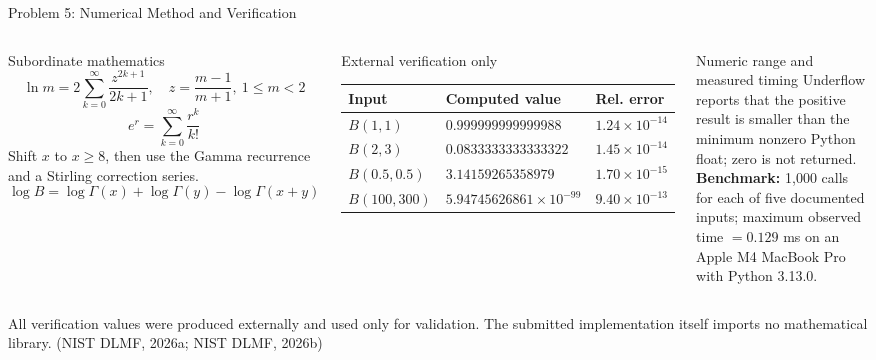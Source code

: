 \documentclass[aspectratio=169,10pt]{beamer}
\newcommand{\smallcite}[1]{{\scriptsize (#1)}}
\begin{document}
\begin{frame}{Problem 5: Numerical Method and Verification}
  \begin{columns}[T]
    \begin{block}{Subordinate mathematics}
      \footnotesize
      \[
        \ln m=2\sum_{k=0}^{\infty}
        \frac{z^{2k+1}}{2k+1},
        \quad z=\frac{m-1}{m+1},\ 1\le m<2
      \]
      \[
        e^r=\sum_{k=0}^{\infty}\frac{r^k}{k!}
      \]
      Shift \(x\) to \(x\ge 8\), then use the Gamma recurrence and a Stirling
      correction series.
      \[
        \log B=\log\Gamma(x)+\log\Gamma(y)-\log\Gamma(x+y)
      \]
    \end{block}

    \begin{block}{External verification only}
      \scriptsize
      \begin{tabular}{@{}lll@{}}
        \toprule
        Input & Computed value & Rel. error\\
        \midrule
        \(B(1,1)\) & \(0.999999999999988\) & \(1.24\times10^{-14}\)\\
        \(B(2,3)\) & \(0.0833333333333322\) & \(1.45\times10^{-14}\)\\
        \(B(0.5,0.5)\) & \(3.14159265358979\) & \(1.70\times10^{-15}\)\\
        \(B(100,300)\) & \(5.94745626861\times10^{-99}\) & \(9.40\times10^{-13}\)\\
        \bottomrule
      \end{tabular}
    \end{block}

    \begin{alertblock}{Numeric range and measured timing}
      \scriptsize
      Underflow reports that the positive result is smaller than the minimum
      nonzero Python float; zero is not returned.\\[0.25em]
      \textbf{Benchmark:} 1,000 calls for each of five documented inputs;
      maximum observed time \(=0.129\) ms on an Apple M4 MacBook Pro with
      Python 3.13.0.
    \end{alertblock}
  \end{columns}

  \scriptsize
  All verification values were produced externally and used only for
  validation. The submitted implementation itself imports no mathematical
  library.
  \smallcite{NIST DLMF, 2026a; NIST DLMF, 2026b}
\end{frame}
\end{document}
